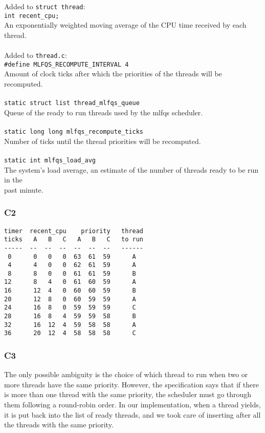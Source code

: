\documentclass[a4wide, 11pt]{article}
\newcommand{\tab}{\hspace*{2em}}
\newcommand{\tx}{\texttt}
\begin{document}
Added to \tx{struct thread}: \\
\tab\tab \tx{int recent\_cpu;} \\
\tab\tab An exponentially weighted moving average of the CPU time received by each thread.
\\\\
Added to \tx{thread.c}: \\
\tab\tab \tx{\#define MLFQS\_RECOMPUTE\_INTERVAL 4} \\
\tab\tab Amount of clock ticks after which the priorities of the threads will be recomputed.
\\\\
\tab\tab \tx{static struct list thread\_mlfqs\_queue}\\
\tab\tab Queue of the ready to run threads used by the mlfqs scheduler.
\\\\
\tab\tab \tx{static long long mlfqs\_recompute\_ticks} \\
\tab\tab Number of ticks until the thread priorities will be recomputed.
\\\\
\tab\tab \tx{static int mlfqs\_load\_avg}\\
\tab\tab The system's load average, an estimate of the number of threads ready to be run in the \\
\tab\tab past minute.
\newpage
\subsubsection{C2}
\begin{verbatim}
timer  recent_cpu    priority   thread
ticks   A   B   C   A   B   C   to run
-----  --  --  --  --  --  --   ------
 0      0   0   0  63  61  59      A
 4      4   0   0  62  61  59      A  
 8      8   0   0  61  61  59      B
12      8   4   0  61  60  59      A
16      12  4   0  60  60  59      B
20      12  8   0  60  59  59      A     
24      16  8   0  59  59  59      C
28      16  8   4  59  59  58      B 
32      16  12  4  59  58  58      A        
36      20  12  4  58  58  58      C
\end{verbatim}

\subsubsection{C3}
The only possible ambiguity is the choice of which thread to run when two or more threads have the same priority. However, the specification says that if there is more than one thread with the same priority, the scheduler must go through them following a round-robin order. In our implementation, when a thread yields, it is put back into the list of ready threads, and we took care of inserting after all the threads with the same priority.
\end{document}
